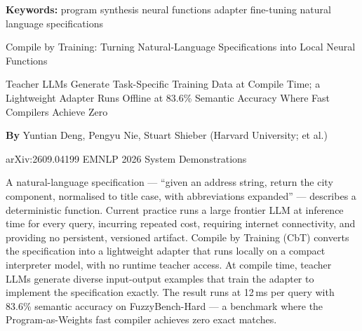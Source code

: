 \documentclass[10pt,twocolumn]{article}
\begin{document}
\setlength{\parindent}{0pt}
\setlength{\parskip}{4pt}

{\small\color{keywordgray}\textbf{Keywords:}
  program synthesis \textbullet{}
  neural functions \textbullet{}
  adapter fine-tuning \textbullet{}
  natural language specifications}\par\vspace{4pt}

{\LARGE\bfseries\raggedright
  Compile by Training: Turning Natural-Language
  Specifications into Local Neural Functions}\par\vspace{4pt}

{\large\itshape\raggedright
  Teacher LLMs Generate Task-Specific Training Data
  at Compile Time; a Lightweight Adapter Runs Offline
  at 83.6\% Semantic Accuracy Where Fast Compilers
  Achieve Zero}\par\vspace{6pt}

{\small\textbf{By} Yuntian Deng, Pengyu Nie, Stuart Shieber
  (Harvard University; et al.)}\par\vspace{2pt}

{\small\color{keywordgray}arXiv:2609.04199 \textbullet{} EMNLP 2026 System Demonstrations}
\par\vspace{2pt}\noindent{\color{rulered}\rule{\columnwidth}{0.6pt}}\vspace{6pt}

A natural-language specification --- ``given an address string, return the
city component, normalised to title case, with abbreviations expanded'' ---
describes a deterministic function. Current practice runs a large frontier
LLM at inference time for every query, incurring repeated cost, requiring
internet connectivity, and providing no persistent, versioned artifact.
Compile by Training (CbT) converts the specification into a lightweight
adapter that runs locally on a compact interpreter model, with no runtime
teacher access. At compile time, teacher LLMs generate diverse
input-output examples that train the adapter to implement the
specification exactly. The result runs at 12\,ms per query with 83.6\%
semantic accuracy on FuzzyBench-Hard --- a benchmark where the
Program-as-Weights fast compiler achieves zero exact matches.
\end{document}
